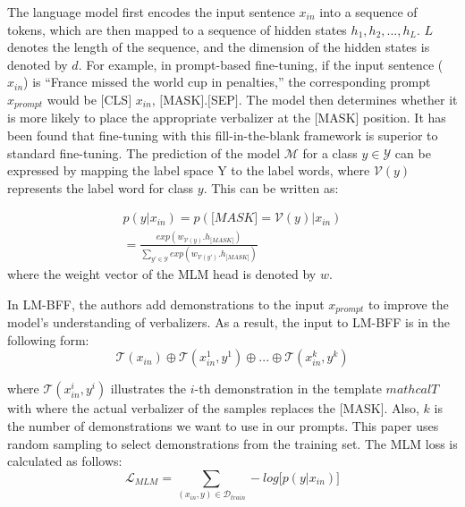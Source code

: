 \documentclass[11pt]{article}
\begin{document}
The language model first encodes the input sentence $x_{in}$ into a sequence of tokens, which are then mapped to a sequence of hidden states ${ h_1, h_2, ..., h_{L} }$. $ L$ denotes the length of the sequence, and the dimension of the hidden states is denoted by $d$. For example, in prompt-based fine-tuning, if the input sentence ($x_{in}$) is ``France missed the world cup in penalties,'' the corresponding prompt $x_{prompt}$ would be $\lbrack$CLS$\rbrack$ $x_{in}$, $\lbrack$MASK$\rbrack$.$\lbrack$SEP$\rbrack$. The model then determines whether it is more likely to place the appropriate verbalizer at the [MASK] position. It has been found that fine-tuning with this fill-in-the-blank framework is superior to standard fine-tuning. The prediction of the model $\mathcal{M}$ for a class $y \in \mathcal{Y}$ can be expressed by mapping the label space Y to the label words, where $\mathcal{V}(y)$ represents the label word for class $y$. This can be written as:

\begin{equation}
        \begin{split}
        p(y|x_{in})=p(\lbrack MASK\rbrack = \mathcal{V}(y)|x_{in}) \\
        =\frac{exp(w_{\mathcal{V}(y)}.h_{\lbrack MASK\rbrack})}{\sum_{y'\in \mathcal{Y}}^{} exp(w_{\mathcal{V}(y')}.h_{\lbrack MASK\rbrack}) } 
    \end{split}
\end{equation}
where the weight vector of the MLM head is denoted by $w$.

In LM-BFF, the authors add demonstrations to the input $x_{prompt}$ to improve the model's understanding of verbalizers. As a result, the input to LM-BFF is in the following form:
\begin{equation}
    \mathcal{T}(x_{in}) \oplus \mathcal{T}(x_{in}^1,y^1) \oplus ... \oplus \mathcal{T}(x_{in}^k,y^k) 
\end{equation}

where $\mathcal{T}(x_{in}^i,y^i)$ illustrates the $i$-th demonstration in the template $mathcal{T}$ with where the actual verbalizer of the samples replaces the [MASK]. Also, $k$ is the number of demonstrations we want to use in our prompts. This paper uses random sampling to select demonstrations from the training set. The MLM loss is calculated as follows:
\begin{equation}
    \mathcal{L}_{MLM} = \sum_{(x_{in},y)\in \mathcal{D}_{train}} -log\lbrack p(y|x_{in})\rbrack 
\end{equation}
\end{document}
